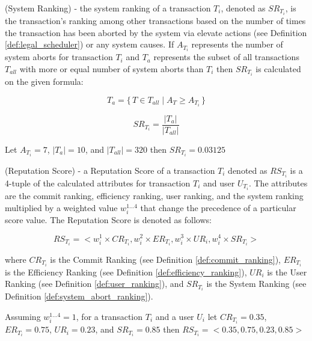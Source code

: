 \begin{definition}
\label{def:system_abort_ranking}
(System Ranking) - the system ranking of a transaction $T_{i}$, denoted as $SR_{T_{i}}$, is the transaction's ranking among other transactions based on the number of times the transaction has been aborted by the system via elevate actions (see Definition \ref{def:legal_scheduler}) or any system causes. If $A_{T_{i}}$ represents the number of system aborts for transaction $T_{i}$ and $T_{a}$ represents the subset of all transactions $T_{all}$ with more or equal number of system aborts than $T_{i}$ then $SR_{T_{i}}$ is calculated on the given formula:

\[\textrm{$T_{a}$} = \{\, T\in \textrm{$T_{all}$} \mid \textrm{$A_{T} \geq A_{T_{i}}$} \,\}\]

\[\textrm{$SR_{T_{i}} = \frac{|T_{a}|}{|T_{all}|}$}\]

\begin{example}
Let $A_{T_{i}} = 7$, $|T_{a}| = 10$, and $|T_{all}| = 320$ then $SR_{T_{i}} = 0.03125$
\end{example}
\end{definition}

\begin{definition}
\label{def:reputation_score}
(Reputation Score) - a Reputation Score of a transaction $T_{i}$ denoted as $RS_{T_{i}}$ is a 4-tuple of the calculated attributes  for transaction $T_{i}$ and user $U_{T_{i}}$. The attributes are the commit ranking, efficiency ranking, user ranking, and the system ranking multiplied by a weighted value $w_{i}^{1...4}$ that change the precedence of a particular score value. The Reputation Score is denoted as follows:

\[\textrm{$RS_{T_{i}} = <w_{i}^{1}\times CR_{T_{i}},w_{i}^{2}\times ER_{T_{i}},w_{i}^{3}\times UR_{i},w_{i}^{4}\times SR_{T_{i}}>$}\]

where $CR_{T_{i}}$ is the Commit Ranking (see Definition \ref{def:commit_ranking}), $ER_{T_{i}}$ is the Efficiency Ranking (see Definition \ref{def:efficiency_ranking}), $UR_{i}$ is the User Ranking (see Definition \ref{def:user_ranking}), and $SR_{T_{i}}$ is the System Ranking (see Definition \ref{def:system_abort_ranking}).
\begin{example}
Assuming $w_{i}^{1...4} = 1$, for a transaction $T_{i}$ and a user $U_{i}$ let $CR_{T_{i}} = 0.35$, $ER_{T_{i}} = 0.75$, $UR_{i} = 0.23$, and $SR_{T_{i}} = 0.85$ then $RS_{T_{i}} = <0.35,0.75,0.23,0.85>$
\end{example}
\end{definition}

